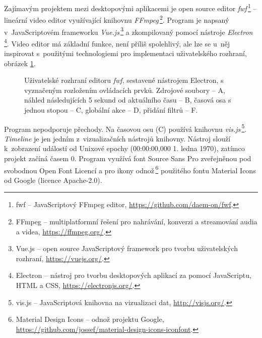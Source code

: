 Zajímavým projektem mezi desktopovými aplikacemi je open source editor \textit{fwf}\,\footnote{fwf -- JavaScriptový FFmpeg editor, \url{https://github.com/daem-on/fwf}.} -- lineární video editor využívající knihovnu \textit{FFmpeg}\,\footnote{FFmpeg -- multiplatformní řešení pro nahrávání, konverzi a streamování audia a videa, \url{https://ffmpeg.org/}.}. Program je napsaný v~JavaScriptovém frameworku \textit{Vue.js}\,\footnote{Vue.js -- open source JavaScriptový framework pro tvorbu uživatelských rozhraní, \url{https://vuejs.org/}.} a zkompilovaný pomocí nástroje \textit{Electron}\,\footnote{Electron -- nástroj pro tvorbu desktopových aplikací za pomocí JavaScriptu, HTML a CSS, \url{https://electronjs.org/}.}. Video editor má základní funkce, není příliš spolehlivý, ale lze se u~něj inspirovat s~použitými technologiemi pro implementaci uživatelského rozhraní, obrázek \ref{img:fwf}.
\begin{figure}[h]
	\centering
	\caption{Uživatelské rozhraní editoru \textit{fwf}, sestavené nástrojem Electron, s vyznačeným rozložením ovládacích prvků. Zdrojové soubory -- A, náhled následujících 5 sekund od aktuálního času -- B, časová osa s jednou stopou -- C, globální akce -- D, přidání filtrů -- F.}\label{img:fwf}
\end{figure}
Program nepodporuje přechody. Na časovou osu (C) používá knihovnu \textit{vis.js}\,\footnote{vis.js -- JavaScriptová knihovna na vizualizaci dat, \url{http://visjs.org/}.}. \textit{Timeline} je jen jedním z~vizualizačních nástrojů knihovny. Nástroj slouží k~zobrazení událostí od Unixové epochy (00:00:00,000 1. ledna 1970), zatímco projekt začíná časem 0. Program využívá font Source Sans Pro zveřejněnou pod svobodnou Open Font Licencí a pro ikony odnož\,\footnote{Material Design Icons -- odnož projektu Google, \url{https://github.com/jossef/material-design-icons-iconfont}.} použitého fontu Material Icons od Google (licence Apache-2.0).

